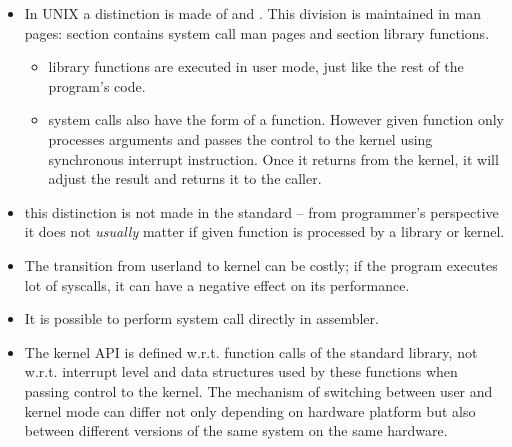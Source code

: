 
\begin{slide}
\begin{itemize}
\item In UNIX a distinction is made of  and . This division is maintained in man pages: section  contains
system call man pages and section  library functions.
    \begin{itemize}
    \item library functions are executed in user mode, just like the rest
    of the program's code.
    \item system calls also have the form of a function. However given function
    only processes arguments and passes the control to the kernel using
    synchronous interrupt instruction. Once it returns from the kernel,
    it will adjust the result and returns it to the caller.
    \end{itemize}
\item this distinction is not made in the standard -- from programmer's
perspective it does not \emph{usually} matter if given function is processed
by a library or kernel.
\end{itemize}
\end{slide}

\begin{itemize}
\item The transition from userland to kernel can be costly; if the program
executes lot of syscalls, it can have a negative effect on its performance.
\item It is possible to perform system call directly in assembler.
\item The kernel API is defined w.r.t. function calls of the standard library,
not w.r.t. interrupt level and data structures used by these functions when
passing control to the kernel. The mechanism of switching between user and
kernel mode can differ not only depending on hardware platform but also between
different versions of the same system on the same hardware.
\end{itemize}



